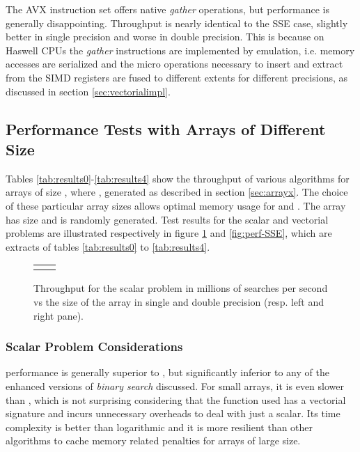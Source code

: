 \documentclass[preprint,1p,times]{elsarticle}
\begin{document}
The AVX instruction set offers native \textit{gather} operations, but performance is generally disappointing. Throughput is nearly identical to the SSE case, slightly better in single precision and worse in double precision. This is because on Haswell CPUs the \textit{gather} instructions are implemented by emulation, i.e. memory accesses are serialized and the micro operations necessary to insert and extract from the SIMD registers are fused to different extents for different precisions, as discussed in section \ref{sec:vectorialimpl}.

\subsection{Performance Tests with Arrays  of Different Size}
\label{sec:testthroughput}
Tables \ref{tab:results0}-\ref{tab:results4} show the throughput of various algorithms for arrays  of size , where , generated as described in section \ref{sec:arrayx}. The choice of these particular array sizes allows optimal memory usage for \textit{\EytzingerName} and \textit{\BitSetName}. The array  has size  and is randomly generated. Test results for the scalar and vectorial problems are illustrated respectively in figure \ref{fig:perf-scalar} and \ref{fig:perf-SSE}, which are extracts of tables \ref{tab:results0} to \ref{tab:results4}.

\pgfplotsset{width=6cm} 

\begin{figure}\begin{tabular}{@{\hskip1pt}c@{\hskip1pt} @{\hskip1pt}c@{\hskip1pt}}
		\perfchart{scalar}{single} & \perfchart{scalar}{double}
\end{tabular}
\vspace*{-4mm}
\caption{Throughput for the scalar problem in millions of searches per second vs the size of the array  in single and double precision (resp. left and right pane).}
\label{fig:perf-scalar}\end{figure}

\subsubsection{Scalar Problem Considerations}

\textit{\MKLName} performance is generally superior to \textit{\ClassicName}, but significantly inferior to any of the enhanced versions of \textit{binary search} discussed. For small arrays, it is even slower than \textit{\ClassicName}, which is not surprising considering that the function used has a vectorial signature and incurs unnecessary overheads to deal with just a scalar. Its time complexity is better than logarithmic and it is more resilient than other algorithms to cache memory related penalties for arrays  of large size.
\end{document}
